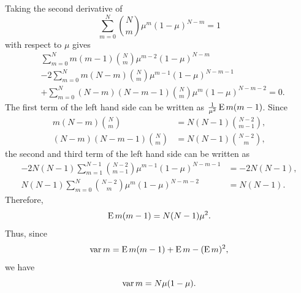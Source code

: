 Taking  the second derivative of 
%
\begin{equation}
\sum_{m = 0}^{N} 
{N \choose m} 
\mu ^ m 
(1 - \mu) ^ {N - m} 
= 
1
\end{equation}
%
with respect to $\mu$ gives
%
\begin{equation}
\begin{aligned}
&
\sum_{m = 0}^{N} 
m 
(m - 1) 
{N \choose m} 
\mu ^ {m - 2} 
(1 - \mu) ^ {N - m} 
\\
&
- 
2 
\sum_{m = 0}^{N} 
m 
(N - m) 
{N \choose m} 
\mu ^ {m - 1} 
(1 - \mu) ^ {N - m - 1} 
\\
&
+ 
\sum_{m = 0}^{N} 
(N - m) 
(N - m - 1) 
{N \choose m} 
\mu ^ m 
(1 - \mu) ^ {N - m - 2} 
= 
0.
\end{aligned}
\end{equation}
%
The first term of the left hand side can be written as $\frac{1}{\mu ^ 2} \operatorname{E} m (m - 1)$.
Since
%
\begin{equation}
\begin{aligned}
m 
(N - m) 
{N \choose m} 
&= 
N 
(N - 1) 
{N - 2 \choose m - 1}, 
\\
(N - m) 
(N - m - 1) 
{N \choose m} 
&= 
N 
(N - 1) 
{N - 2 \choose m},
\end{aligned}
\end{equation}
%
the second and third term of the left hand side can be written as
%
\begin{equation}
\begin{aligned}
- 
2 
N 
(N - 1) 
\sum_{m = 1}^{N - 1} 
{N - 2 \choose m - 1} 
\mu ^ {m - 1} 
(1 - \mu) ^ {N - m - 1} 
&= 
- 
2 
N 
(N - 1), \\
N 
(N - 1) 
\sum_{m = 0}^{N} 
{N - 2 \choose m} 
\mu ^ m 
(1 - \mu) ^ {N - m - 2} 
&= 
N 
(N - 1).
\end{aligned}
\end{equation}
%
Therefore,
%
\begin{equation}
\operatorname{E} m (m - 1) 
= 
N 
(N - 1) 
\mu ^ 2.
\end{equation}
%
Thus, since 
%
\begin{equation}
\operatorname{var} m 
= 
\operatorname{E} m (m - 1) 
+ 
\operatorname{E} m 
- 
( \operatorname{E} m ) ^ 2,
\end{equation}
%
we have
%
\begin{equation}
\operatorname{var} m 
= 
N 
\mu 
( 1 - \mu).
\end{equation}
%


